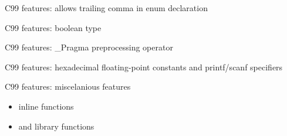 \begin{frame}{C99 features: allows trailing comma in enum declaration}
    \scalebox{0.8}{
        
    }
\end{frame}
\begin{frame}{C99 features: boolean type}
%            
\end{frame}
\begin{frame}{C99 features: \_Pragma preprocessing operator}
    
\end{frame}
\begin{frame}{C99 features: hexadecimal floating-point constants and printf/scanf specifiers}
    
\end{frame}
\begin{frame}{C99 features: miscelanious features}
    \begin{itemize}
        \item inline functions
        \pause\item {} and library functions
    \end{itemize}
\end{frame}

